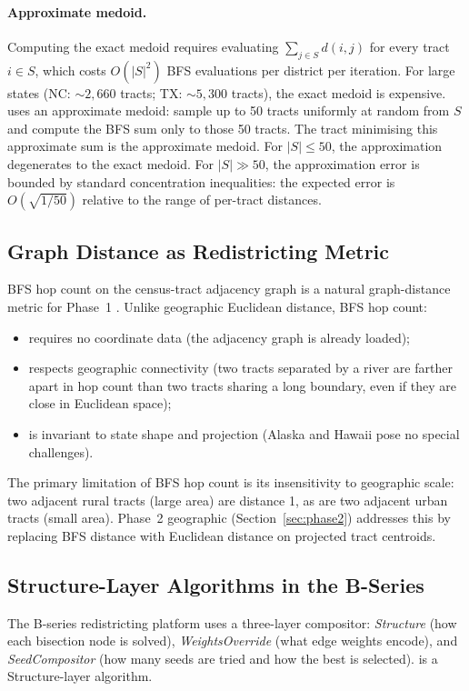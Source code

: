 \paragraph{Approximate medoid.}
Computing the exact medoid requires evaluating $\sum_{j \in S} d(i,j)$
for every tract $i \in S$, which costs $O(|S|^2)$ BFS evaluations per
district per iteration.
For large states (NC: $\sim 2{,}660$ tracts; TX: $\sim 5{,}300$ tracts),
the exact medoid is expensive.
\cvd{} uses an approximate medoid: sample up to 50 tracts uniformly at
random from $S$ and compute the BFS sum only to those 50 tracts.
The tract minimising this approximate sum is the approximate medoid.
For $|S| \le 50$, the approximation degenerates to the exact medoid.
For $|S| \gg 50$, the approximation error is bounded by standard
concentration inequalities: the expected error is $O(\sqrt{1/50})$ relative
to the range of per-tract distances.

\subsection{Graph Distance as Redistricting Metric}

BFS hop count on the census-tract adjacency graph is a natural graph-distance
metric for Phase~1 \cvd{}.
Unlike geographic Euclidean distance, BFS hop count:
\begin{itemize}
\item requires no coordinate data (the adjacency graph is already loaded);
\item respects geographic connectivity (two tracts separated by a river
  are farther apart in hop count than two tracts sharing a long boundary,
  even if they are close in Euclidean space);
\item is invariant to state shape and projection (Alaska and Hawaii pose
  no special challenges).
\end{itemize}
The primary limitation of BFS hop count is its insensitivity to geographic
scale: two adjacent rural tracts (large area) are distance 1, as are two
adjacent urban tracts (small area).
Phase~2 geographic \cvd{} (Section~\ref{sec:phase2}) addresses this by
replacing BFS distance with Euclidean distance on projected tract centroids.

\subsection{Structure-Layer Algorithms in the B-Series}

The B-series redistricting platform uses a three-layer compositor:
\emph{Structure} (how each bisection node is solved),
\emph{WeightsOverride} (what edge weights encode), and
\emph{SeedCompositor} (how many seeds are tried and how the best is selected).
\cvd{} is a Structure-layer algorithm.

